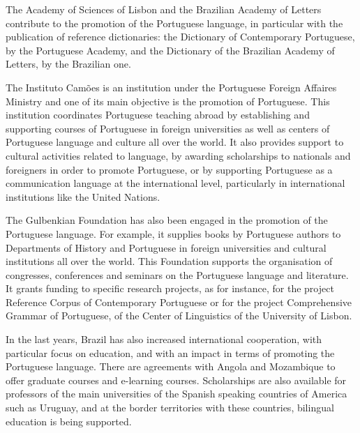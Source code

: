 \begin{multicols}{2}

The Academy of Sciences of Lisbon and the Brazilian Academy of Letters contribute to the promotion of the Portuguese language, 
in particular with the publication of reference dictionaries: the Dictionary of Contemporary Portuguese, by the Portuguese Academy, 
and the Dictionary of the Brazilian Academy of Letters, by the Brazilian one. 

The Instituto Camões is an institution under the Portuguese Foreign Affaires Ministry 
and one of its main objective is the promotion of Portuguese. 
This institution coordinates Portuguese teaching abroad by establishing and supporting  
courses of Portuguese in foreign universities as well as centers of Portuguese language and culture all over the world.
It also provides support to cultural activities related to language, by awarding scholarships to nationals and foreigners in order to promote Portuguese, or by supporting Portuguese as a communication language at the international level, particularly in international institutions like the United Nations. 


The Gulbenkian Foundation \cite{gulbenkian} has also been engaged in the promotion of the Portuguese language.
For example, it supplies books by Portuguese authors to Departments of History and Portuguese in foreign universities and cultural institutions all over the world. 
This Foundation supports the organisation of congresses, conferences and seminars on the Portuguese language and literature. 
It grants funding to specific research projects, as for instance, for the project Reference Corpus of Contemporary Portuguese or for 
the project Comprehensive Grammar of Portuguese, of the Center of Linguistics of the University of Lisbon.

In the last years, Brazil has also increased international cooperation, with particular focus on education, and with an impact in terms
of promoting the Portuguese language. There are agreements with Angola and Mozambique to offer graduate courses and e-learning courses. 
Scholarships are also available for professors of the main universities of the Spanish speaking countries of America such as Uruguay, and at the border territories with these countries, bilingual education is being supported.


\end{multicols}

